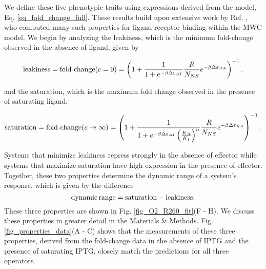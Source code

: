We define these five phenotypic traits using expressions derived from the model,
Eq. \ref{eq_fold_change_full}. These results build upon extensive work by
Ref. \cite{Martins2011}, who computed many such properties for ligand-receptor
binding within the MWC model. We begin by analyzing the leakiness, which is the
minimum fold-change observed in the absence of ligand, given by

\begin{equation}
\label{eqLeakiness}
\text{leakiness} = \text{fold-change}(c=0) \nonumber\\
= \left(
	1+\frac{1}{1+e^{-\beta \Delta \varepsilon_{AI} }}\frac{R}{N_{NS}}e^{-\beta \Delta\varepsilon_{RA}} \right)^{-1},
\end{equation}

and the saturation, which is the maximum fold change observed in the presence of saturating ligand,

\begin{equation}
\label{eqSaturation}
\text{saturation} = \text{fold-change}(c \to \infty) \nonumber\\
= \left(
	1+\frac{1}{1+e^{-\beta \Delta \varepsilon_{AI} } \left(\frac{K_A}{K_I}\right)^n }\frac{R}{N_{NS}}e^{-\beta \Delta\varepsilon_{RA}} \right)^{-1}.
\end{equation}


Systems that minimize leakiness repress strongly in the absence of effector
while systems that maximize saturation have high expression in the presence of
effector. Together, these two properties determine the dynamic range of a
system's response, which is given by the difference
\begin{equation} \label{eqDynamicRangeDef}
	\text{dynamic\,range} = \text{saturation} - \text{leakiness}.
\end{equation}
These three properties are shown in Fig. \ref{fig_O2_R260_fit}(F - H).
We discuss these properties in greater detail in the Materials \& Methods.
Fig. \ref{fig_properties_data}(A - C) shows that the measurements of
these three properties, derived from the fold-change data in the absence of IPTG
and the presence of saturating IPTG, closely match the predictions for all three
operators.

